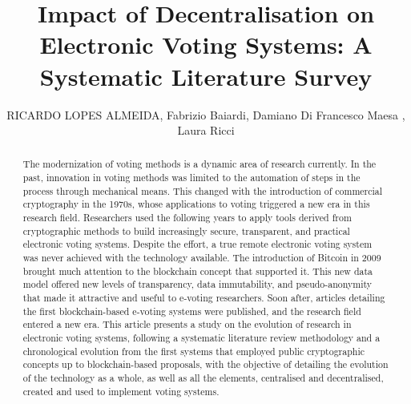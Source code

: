 \documentclass{ieeeaccess}
\begin{document}

\title{Impact of Decentralisation on Electronic Voting Systems: A Systematic Literature Survey}
\author{\uppercase{Ricardo Lopes Almeida}, 
Fabrizio Baiardi,
Damiano Di Francesco Maesa , 
Laura Ricci
}

\address[1]{Universit\'a di Camerino, 62032 MC, Camerino, Italy (e-mail: ricardo.almeida@unicam.it)}
\address[2]{Dipartimento di Informatica, Universit\'a di Pisa, 56127 PI, Pisa, Italy}





\begin{abstract}
    The modernization of voting methods is a dynamic area of research currently. In the past, innovation in voting methods was limited to the automation of steps in the process through mechanical means. This changed with the introduction of commercial cryptography in the 1970s, whose applications to voting triggered a new era in this research field. Researchers used the following years to apply tools derived from cryptographic methods to build increasingly secure, transparent, and practical electronic voting systems. Despite the effort, a true remote electronic voting system was never achieved with the technology available. The introduction of Bitcoin in 2009 brought much attention to the blockchain concept that supported it. This new data model offered new levels of transparency, data immutability, and pseudo-anonymity that made it attractive and useful to e-voting researchers. Soon after, articles detailing the first blockchain-based e-voting systems were published, and the research field entered a new era. This article presents a study on the evolution of research in electronic voting systems, following a systematic literature review methodology and a chronological evolution from the first systems that employed public cryptographic concepts up to blockchain-based proposals, with the objective of detailing the evolution of the technology as a whole, as well as all the elements, centralised and decentralised, created and used to implement voting systems.
\end{abstract}
\end{document}
